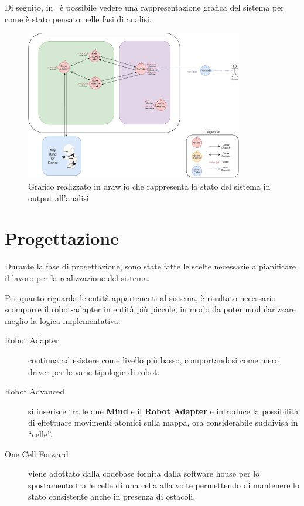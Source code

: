 \documentclass{llncs}
\newcommand{\labelsec}[1]{\label{sec:#1}}
\begin{document}
Di seguito, in~ è possibile vedere una rappresentazione grafica del sistema per come è stato pensato nelle fasi di analisi.

\begin{figure}[h]
  \centering%
  \includegraphics[width=0.85\textwidth]{res/analysis}%
  \caption{Grafico realizzato in draw.io che rappresenta lo stato del sistema in output all'analisi}%
  \label{fig:analysis}
\end{figure}

\newpage

\section{Progettazione}\labelsec{project}

Durante la fase di progettazione, sono state fatte le scelte necessarie a pianificare il lavoro per la realizzazione del sistema.

Per quanto riguarda le entità appartenenti al sistema, è risultato necessario scomporre il robot-adapter in entità più piccole, in modo da poter modularizzare meglio la logica implementativa:

\begin{description}
  \item[Robot Adapter] continua ad esistere come livello più basso, comportandosi come mero driver per le varie tipologie di robot.
  \item[Robot Advanced] si inserisce tra le due \textbf{Mind} e il \textbf{Robot Adapter} e introduce la possibilità di effettuare movimenti atomici sulla mappa, ora considerabile suddivisa in ``celle''.
  \item[One Cell Forward] viene adottato dalla codebase fornita dalla software house per lo spostamento tra le celle di una cella alla volte permettendo di mantenere lo stato consistente anche in presenza di ostacoli.
\end{description}
\end{document}
